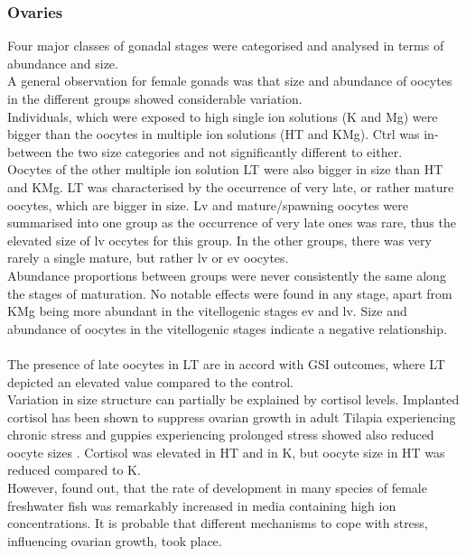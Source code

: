 \documentclass[twoside]{article}
\begin{document}
\begin{multicols}{2}
\subsubsection*{Ovaries}
Four major classes of gonadal stages were categorised and analysed in terms of abundance and size. \\
A general observation for female gonads was that size and abundance of oocytes in the different groups showed considerable variation.  \\ Individuals, which were exposed to high single ion solutions (K and Mg) were bigger than the oocytes in multiple ion solutions (HT and KMg). Ctrl was in-between the two size categories and not significantly different to either.  \\
Oocytes of the other multiple ion solution LT were also bigger in size than HT and KMg.  LT was characterised by the occurrence of very late, or rather mature oocytes, which are bigger in size. Lv and mature/spawning oocytes were summarised into one group as the occurrence of very late ones was rare, thus the elevated size of lv  occytes for this group. In the other groups, there was very rarely a single mature, but rather lv or ev oocytes. \\
Abundance proportions between groups were never consistently the same along the stages of maturation. No notable effects were found in any stage, apart from KMg being more abundant in the vitellogenic stages ev and lv.
Size and abundance of oocytes in the vitellogenic stages indicate a negative relationship. \\ \\
The presence of late oocytes in LT are in accord with GSI outcomes, where LT depicted an elevated value compared to the control. \\ 
Variation in size structure can partially be explained by cortisol levels. Implanted cortisol has been shown to suppress ovarian growth in adult Tilapia experiencing chronic stress \citep{foo1993}  and guppies experiencing prolonged stress showed also reduced oocyte sizes \citep{dahlgren1979}. Cortisol was elevated in HT and in K, but oocyte size in HT was  reduced compared to K. \\ However, \cite{Heuts1947} found out, that the rate of development in many species of female freshwater fish was remarkably increased in media containing high ion concentrations. It is probable that different mechanisms to cope with stress, influencing ovarian growth, took place. \\


\end{multicols}
\end{document}
